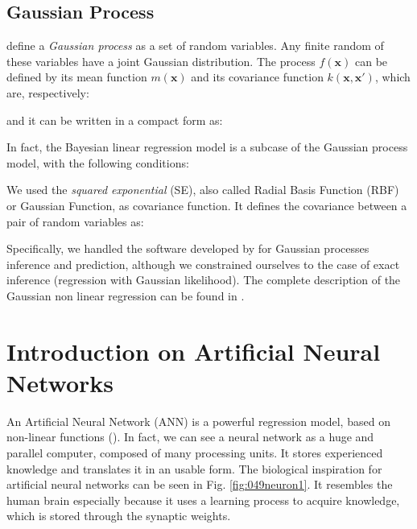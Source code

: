 \subsection{Gaussian Process}
\label{subsec:gaussianprocess}

\citet{RefWorks:192} define a \textit{Gaussian process} as a set of random variables. 
Any finite random of these variables have a joint Gaussian distribution.
The process $f(\mathbf{x})$ can be defined by its mean function $m(\mathbf{x})$
and its covariance function $k(\mathbf{x, x'})$, which are, respectively:


and it can be written in a compact form as:

In fact, the Bayesian linear regression model is a subcase of the Gaussian
process model, with the following conditions:

We used the \textit{squared exponential} (SE), also called Radial Basis Function
(\acs{RBF}) or Gaussian Function, as covariance function. It defines the
covariance between a pair of random variables as:


Specifically, we handled the software developed by \citet{RefWorks:192} 
for Gaussian processes inference and prediction, although we constrained ourselves to the case of exact inference
(regression with Gaussian likelihood).
The complete description of the Gaussian non linear regression can be found in
\citet{RefWorks:194}.


\section{Introduction on Artificial Neural Networks}
\label{sec:annintro}
An Artificial Neural Network (\acs{ANN}) is a powerful regression model, 
based on non-linear functions (\citet{RefWorks:158}). 
In fact, we can see a neural network as a huge and parallel computer, composed
of many processing units. 
It stores experienced knowledge and translates it in
an usable form. 
The biological inspiration for artificial neural networks can be seen in Fig.
\ref{fig:049neuron1}. 
It resembles the human brain especially because it
uses a learning process to acquire knowledge, which is stored through the
synaptic weights.




